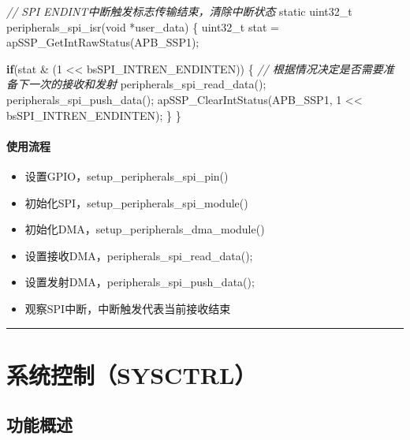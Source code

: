 \documentclass[
  12pt,
]{book}
\newenvironment{Shaded}{\begin{snugshade}}{\end{snugshade}}
\newcommand{\CommentTok}[1]{\textcolor[rgb]{0.56,0.35,0.01}{\textit{#1}}}
\newcommand{\ControlFlowTok}[1]{\textcolor[rgb]{0.13,0.29,0.53}{\textbf{#1}}}
\newcommand{\DataTypeTok}[1]{\textcolor[rgb]{0.13,0.29,0.53}{#1}}
\newcommand{\DecValTok}[1]{\textcolor[rgb]{0.00,0.00,0.81}{#1}}
\newcommand{\NormalTok}[1]{#1}
\providecommand{\tightlist}{%
  \setlength{\itemsep}{0pt}\setlength{\parskip}{0pt}}
\begin{document}
\begin{Shaded}
\begin{Highlighting}[]
\CommentTok{// SPI ENDINT中断触发标志传输结束，清除中断状态}
\DataTypeTok{static} \DataTypeTok{uint32_t}\NormalTok{ peripherals_spi_isr(}\DataTypeTok{void}\NormalTok{ *user_data)}
\NormalTok{\{}
  \DataTypeTok{uint32_t}\NormalTok{ stat = apSSP_GetIntRawStatus(APB_SSP1);}
  
  \ControlFlowTok{if}\NormalTok{(stat & (}\DecValTok{1}\NormalTok{ << bsSPI_INTREN_ENDINTEN))}
\NormalTok{  \{}
    \CommentTok{// 根据情况决定是否需要准备下一次的接收和发射}
\NormalTok{    peripherals_spi_read_data();}
\NormalTok{    peripherals_spi_push_data();}
\NormalTok{    apSSP_ClearIntStatus(APB_SSP1, }\DecValTok{1}\NormalTok{ << bsSPI_INTREN_ENDINTEN);}
\NormalTok{  \}  }
\NormalTok{\}}
\end{Highlighting}
\end{Shaded}

\hypertarget{ux4f7fux7528ux6d41ux7a0b-15}{%
\subsubsection{使用流程}\label{ux4f7fux7528ux6d41ux7a0b-15}}

\begin{itemize}
\tightlist
\item
  设置GPIO，setup\_peripherals\_spi\_pin()
\item
  初始化SPI，setup\_peripherals\_spi\_module()
\item
  初始化DMA，setup\_peripherals\_dma\_module()
\item
  设置接收DMA，peripherals\_spi\_read\_data();
\item
  设置发射DMA，peripherals\_spi\_push\_data();
\item
  观察SPI中断，中断触发代表当前接收结束
\end{itemize}

\begin{center}\rule{0.5\linewidth}{0.5pt}\end{center}

\hypertarget{ch-sysctrl}{%
\chapter{系统控制（SYSCTRL）}\label{ch-sysctrl}}

\hypertarget{ux529fux80fdux6982ux8ff0-4}{%
\section{功能概述}\label{ux529fux80fdux6982ux8ff0-4}}
\end{document}
